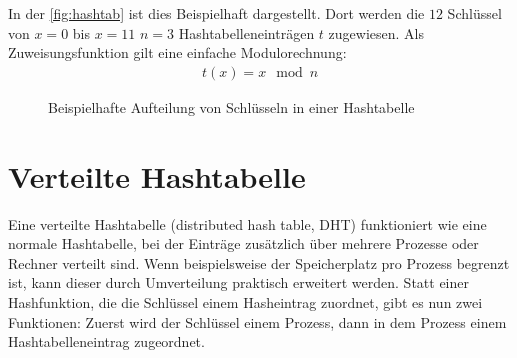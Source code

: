 \documentclass{scrreprt}
\begin{document}
In der \autoref{fig:hashtab} ist dies Beispielhaft dargestellt. Dort werden die $12$ Schlüssel von $x=0$ bis $x=11$ $n=3$ Hashtabelleneinträgen $t$ zugewiesen. Als Zuweisungsfunktion gilt eine einfache Modulorechnung:
\begin{align*}
t(x)=x\mod n
\end{align*}
\begin{figure}[!ht]
\centering
{}
\caption{Beispielhafte Aufteilung von Schlüsseln in einer Hashtabelle}
\label{fig:hashtab}
\end{figure}

\section{Verteilte Hashtabelle}
\label{sec:dht}
Eine verteilte Hashtabelle (distributed hash table, DHT) funktioniert wie eine normale Hashtabelle, bei der Einträge zusätzlich über mehrere Prozesse oder Rechner verteilt sind. Wenn beispielsweise der Speicherplatz pro Prozess begrenzt ist, kann dieser durch Umverteilung praktisch erweitert werden. Statt einer Hashfunktion, die die Schlüssel einem Hasheintrag zuordnet, gibt es nun zwei Funktionen: Zuerst wird der Schlüssel einem Prozess, dann in dem Prozess einem Hashtabelleneintrag zugeordnet. 
\end{document}
